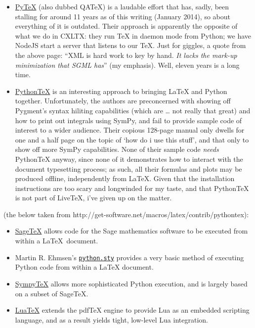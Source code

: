 \begin{itemize}
\item
  \href{http://www.pytex.org/}{PyTeX} (also dubbed QATeX) is a laudable
  effort that has, sadly, been stalling for around 11 years as of this
  writing (January 2014), so about everything of it is outdated. Their
  approach is apparently the opposite of what we do in CXLTX: they run
  TeX in daemon mode from Python; we have NodeJS start a server that
  listens to our TeX. Just for giggles, a quote from the above page:
  ``XML is hard work to key by hand. \emph{It lacks the mark-up
  minimization that SGML has}'' (my emphasis). Well, eleven years is a
  long time.
\item
  \href{https://github.com/gpoore/pythontex}{PythonTeX} is an
  interesting approach to bringing LaTeX and Python together.
  Unfortunately, the authors are preconcerned with showing off Pygment's
  syntax hiliting capabilities (which are \ldots{} not really that
  great) and how to print out integrals using SymPy, and fail to provide
  sample code of interest to a wider audience. Their copious 128-page
  manual only dwells for one and a half page on the topic of `how do i
  use this stuff', and that only to show off more SymPy capabilities.
  None of their sample code \emph{needs} PythonTeX anyway, since none of
  it demonstrates how to interact with the document typesetting process;
  as such, all their formulas and plots may be produced offline,
  independently from LaTeX. Given that the installation instructions are
  too scary and longwinded for my taste, and that PythonTeX is not part
  of LiveTeX, i've given up on the matter.
\end{itemize}

(the below taken from
http://get-software.net/macros/latex/contrib/pythontex):

\begin{itemize}
\item
  \href{http://www.ctan.org/tex-archive/macros/latex/contrib/sagetex}{SageTeX}
  allows code for the Sage mathematics software to be executed from
  within a \LaTeX~document.
\item
  Martin R. Ehmsen's
  \href{http://www.ctan.org/pkg/python}{\texttt{python.sty}} provides a
  very basic method of executing Python code from within a LaTeX
  document.
\item
  \href{http://elec.otago.ac.nz/w/index.php/SympyTeX}{SympyTeX} allows
  more sophisticated Python execution, and is largely based on a subset
  of SageTeX.
\item
  \href{http://www.luatex.org/}{LuaTeX} extends the pdfTeX engine to
  provide Lua as an embedded scripting language, and as a result yields
  tight, low-level Lua integration.
\end{itemize}

